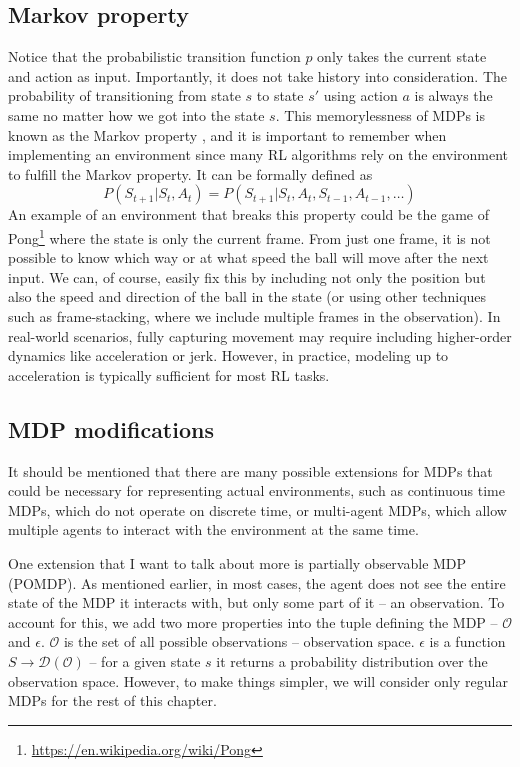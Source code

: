 \documentclass[
  digital,     %
  oneside,     %
  nosansbold,  %
  nocolorbold, %
  lof,         %
  lot,         %
]{fithesis4}
\begin{document}
\subsection{Markov property}
Notice that the probabilistic transition function $p$ only takes the current state and action as input. Importantly, it does not take history into consideration. The probability of transitioning from state $s$ to state $s'$ using action $a$ is always the same no matter how we got into the state $s$. This memorylessness of MDPs is known as the Markov property \cite[p. 49]{GDRL}, and it is important to remember when implementing an environment since many RL algorithms rely on the environment to fulfill the Markov property. It can be formally defined as
\[
P(S_{t+1}|S_t,A_t)=P(S_{t+1}|S_t,A_t,S_{t-1},A_{t-1}, \dotsc)
\]
An example of an environment that breaks this property could be the game of Pong\footnote{\url{https://en.wikipedia.org/wiki/Pong}} where the state is only the current frame. From just one frame, it is not possible to know which way or at what speed the ball will move after the next input. We can, of course, easily fix this by including not only the position but also the speed and direction of the ball in the state (or using other techniques such as frame-stacking, where we include multiple frames in the observation). In real-world scenarios, fully capturing movement may require including higher-order dynamics like acceleration or jerk. However, in practice, modeling up to acceleration is typically sufficient for most RL tasks.

\subsection{MDP modifications}
It should be mentioned that there are many possible extensions for MDPs that could be necessary for representing actual environments, such as continuous time MDPs, which do not operate on discrete time, or multi-agent MDPs, which allow multiple agents to interact with the environment at the same time. \cite[p. 59]{GDRL}

One extension that I want to talk about more is partially observable MDP (POMDP). As mentioned earlier, in most cases, the agent does not see the entire state of the MDP it interacts with, but only some part of it -- an observation. To account for this, we add two more properties into the tuple defining the MDP -- $\mathcal{O}$ and $\epsilon$. $\mathcal{O}$ is the set of all possible observations -- observation space. $\epsilon$ is a function $S \to \mathcal{D}(\mathcal{O})$ -- for a given state $s$ it returns a probability distribution over the observation space. However, to make things simpler, we will consider only regular MDPs for the rest of this chapter.
\end{document}
